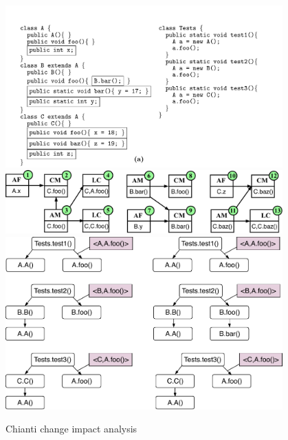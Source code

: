 \begin{figure}
\centering
\includegraphics[width=0.95\textwidth]{images/ChiantiExample.pdf}
\includegraphics[width=0.95\textwidth]{images/ChiantiAtomicChange-v2.pdf}
\includegraphics[width=0.95\textwidth]{images/DynamicCallGraph-v2.pdf}
\caption{Chianti change impact analysis} 
\label{fig:chianti} 
\end{figure}

